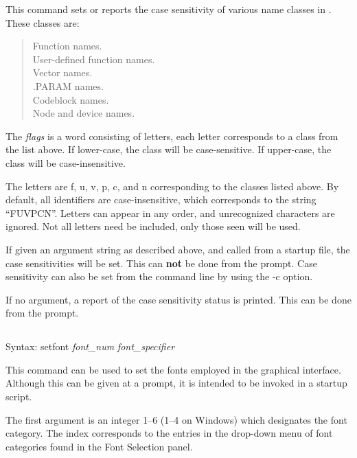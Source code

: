 This command sets or reports the case sensitivity of various name
classes in {\WRspice}.  These classes are:

\begin{quote}
Function names.\\
User-defined function names.\\
Vector names.\\
.PARAM names.\\
Codeblock names.\\
Node and device names.\\
\end{quote}

The {\it flags} is a word consisting of letters, each letter
corresponds to a class from the list above.  If lower-case, the class
will be case-sensitive.  If upper-case, the class will be
case-insensitive.

The letters are {\vt f}, {\vt u}, {\vt v}, {\vt p}, {\vt c}, and {\vt
n} corresponding to the classes listed above.  By default, all
{\WRspice} identifiers are case-insensitive, which corresponds to the
string ``{\vt FUVPCN}''.  Letters can appear in any order, and
unrecognized characters are ignored.  Not all letters need be
included, only those seen will be used.

If given an argument string as described above, and called from a
startup file, the case sensitivities will be set.  This can {\bf not}
be done from the {\WRspice} prompt.  Case sensitivity can also be set
from the command line by using the {\vt -c} option.

If no argument, a report of the case sensitivity status is printed. 
This can be done from the {\WRspice} prompt.


\subsection{}


Syntax: {\vt setfont} {\it font\_num} {\it font\_specifier}

This command can be used to set the fonts employed in the graphical
interface.  Although this can be given at a prompt, it is intended to
be invoked in a startup script.

The first argument is an integer 1--6 (1--4 on Windows) which
designates the font category.  The index corresponds to the entries in
the drop-down menu of font categories found in the Font Selection
panel.

